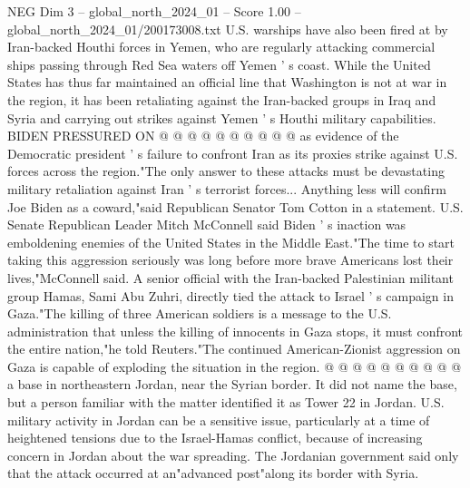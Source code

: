 \begin{textsample}{NEG Dim 3 – global\_north\_2024\_01 – Score 1.00 – global\_north\_2024\_01/200173008.txt}
U.S. warships have also been fired at by Iran-backed Houthi forces in Yemen, who are regularly attacking commercial ships passing through Red Sea waters off Yemen ' s coast.
While the United States has thus far maintained an official line that Washington is not at war in the region, it has been retaliating against the Iran-backed groups in Iraq and Syria and carrying out strikes against Yemen ' s Houthi military capabilities.
BIDEN PRESSURED ON @ @ @ @ @ @ @ @ @ @ as evidence of the Democratic president ' s failure to confront Iran as its proxies strike against U.S. forces across the region."The only answer to these attacks must be devastating military retaliation against Iran ' s terrorist forces...
Anything less will confirm Joe Biden as a coward,"said Republican Senator Tom Cotton in a statement.
U.S.
Senate Republican Leader Mitch McConnell said Biden ' s inaction was emboldening enemies of the United States in the Middle East."The time to start taking this aggression seriously was long before more brave Americans lost their lives,"McConnell said.
A senior official with the Iran-backed Palestinian militant group Hamas, Sami Abu Zuhri, directly tied the attack to Israel ' s campaign in Gaza."The killing of three American soldiers is a message to the U.S. administration that unless the killing of innocents in Gaza stops, it must confront the entire nation,"he told Reuters."The continued American-Zionist aggression on Gaza is capable of exploding the situation in the region. @ @ @ @ @ @ @ @ @ @ a base in northeastern Jordan, near the Syrian border.
It did not name the base, but a person familiar with the matter identified it as Tower 22 in Jordan.
U.S. military activity in Jordan can be a sensitive issue, particularly at a time of heightened tensions due to the Israel-Hamas conflict, because of increasing concern in Jordan about the war spreading.
The Jordanian government said only that the attack occurred at an"advanced post"along its border with Syria.

\end{textsample}
